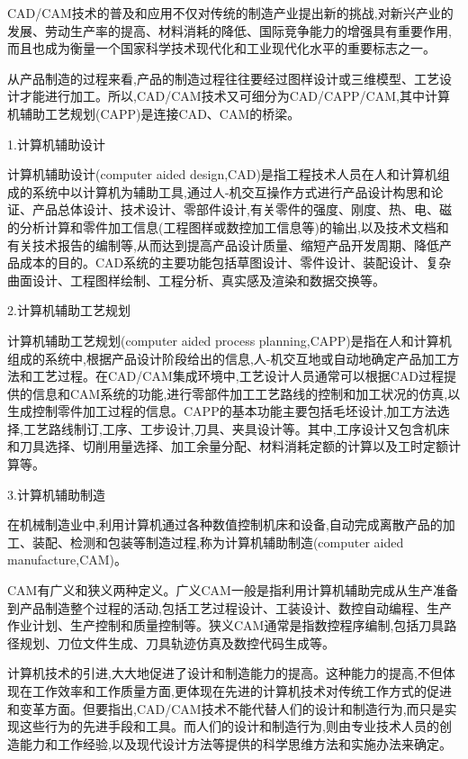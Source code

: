 \documentclass[UTF8]{ctexbook}
\newcommand{\◎}{\ensuremath{\bigcirc}}
\begin{document}
CAD/CAM技术的普及和应用不仅对传统的制造产业提出新的挑战,对新兴产业的发展、劳动生产率的提高、材料消耗的降低、国际竞争能力的增强具有重要作用,而且也成为衡量一个国家科学技术现代化和工业现代化水平的重要标志之一。

从产品制造的过程来看,产品的制造过程往往要经过图样设计或三维模型、工艺设计才能进行加工。所以,CAD/CAM技术又可细分为CAD/CAPP/CAM,其中计算机辅助工艺规划(CAPP)是连接CAD、CAM的桥梁。

1.计算机辅助设计
    
    计算机辅助设计(computer aided design,CAD)是指工程技术人员在人和计算机组成的系统中以计算机为辅助工具,通过人-机交互操作方式进行产品设计构思和论证、产品总体设计、技术设计、零部件设计,有关零件的强度、刚度、热、电、磁的分析计算和零件加工信息(工程图样或数控加工信息等)的输出,以及技术文档和有关技术报告的编制等,从而达到提高产品设计质量、缩短产品开发周期、降低产品成本的目的。CAD系统的主要功能包括草图设计、零件设计、装配设计、复杂曲面设计、工程图样绘制、工程分析、真实感及渲染和数据交换等。
    
2.计算机辅助工艺规划
    
    计算机辅助工艺规划(computer aided process planning,CAPP)是指在人和计算机组成的系统中,根据产品设计阶段给出的信息,人-机交互地或自动地确定产品加工方法和工艺过程。在CAD/CAM集成环境中,工艺设计人员通常可以根据CAD过程提供的信息和CAM系统的功能,进行零部件加工工艺路线的控制和加工状况的仿真,以生成控制零件加工过程的信息。CAPP的基本功能主要包括毛坯设计,加工方法选择,工艺路线制订,工序、工步设计,刀具、夹具设计等。其中,工序设计又包含机床和刀具选择、切削用量选择、加工余量分配、材料消耗定额的计算以及工时定额计算等。
    
3.计算机辅助制造
    
    在机械制造业中,利用计算机通过各种数值控制机床和设备,自动完成离散产品的加工、装配、检测和包装等制造过程,称为计算机辅助制造(computer aided manufacture,CAM)。
    
    CAM有广义和狭义两种定义。广义CAM一般是指利用计算机辅助完成从生产准备到产品制造整个过程的活动,包括工艺过程设计、工装设计、数控自动编程、生产作业计划、生产控制和质量控制等。狭义CAM通常是指数控程序编制,包括刀具路径规划、刀位文件生成、刀具轨迹仿真及数控代码生成等。


计算机技术的引进,大大地促进了设计和制造能力的提高。这种能力的提高,不但体现在工作效率和工作质量方面,更体现在先进的计算机技术对传统工作方式的促进和变革方面。但要指出,CAD/CAM技术不能代替人们的设计和制造行为,而只是实现这些行为的先进手段和工具。而人们的设计和制造行为,则由专业技术人员的创造能力和工作经验,以及现代设计方法等提供的科学思维方法和实施办法来确定。
\end{document}
